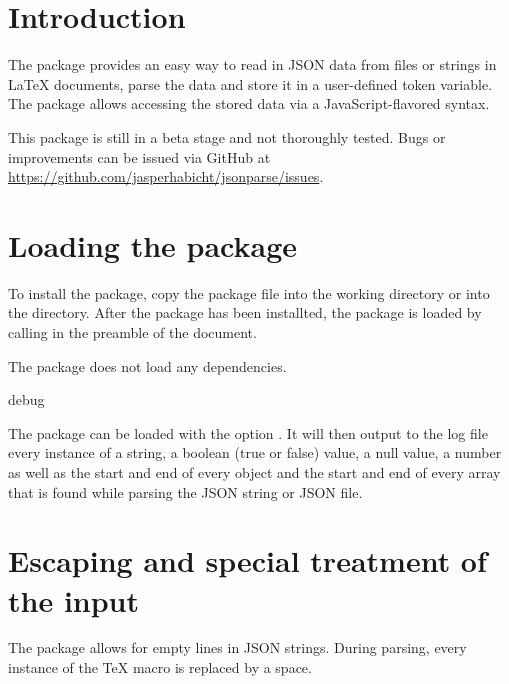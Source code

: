 \documentclass[a4paper]{article}
\begin{document}
\printdoctitle

\bigskip

\section{Introduction}

The  package provides an easy way to read in JSON data from files or strings in LaTeX documents, parse the data and store it in a user-defined token variable. The package allows accessing the stored data via a JavaScript-flavored syntax.

This package is still in a beta stage and not thoroughly tested. Bugs or improvements can be issued via GitHub at \url{https://github.com/jasperhabicht/jsonparse/issues}.

\section{Loading the package}

To install the package, copy the package file  into the working directory or into the  directory. After the package has been installted, the  package is loaded by calling \macro{\usepackage{jsonparse}} in the preamble of the document. 

The package does not load any dependencies.

\begin{macrodef}debug\end{macrodef}
The package can be loaded with the option . It will then output to the log file every instance of a string, a boolean (true or false) value, a null value, a number as well as the start and end of every object and the start and end of every array that is found while parsing the JSON string or JSON file.

\section{Escaping and special treatment of the input}

The package allows for empty lines in JSON strings. During parsing, every instance of the TeX macro \macro{\par} is replaced by a space.
\end{document}
